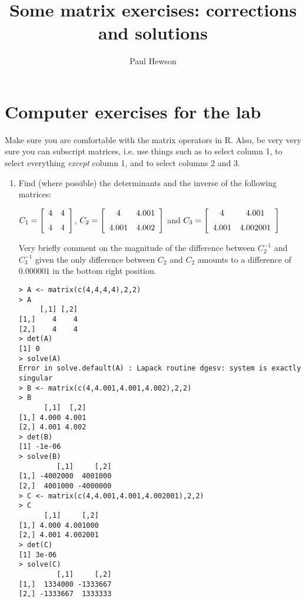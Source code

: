 \documentclass{article}
\title{Some matrix exercises: corrections and solutions}
\author{Paul Hewson}
\begin{document}
\maketitle

\section{Computer exercises for the lab}

Make sure you are comfortable with the matrix operators in R.   Also, be very very sure you can subscript matrices, i.e. use things such as \text{[,1]} to select column 1, \text{[,-1]} to select everything \emph{except} column 1, and \text{[,2:3]} to select columns 2 and 3.

\begin{enumerate}

\item Find (where possible) the determinants and the inverse of the following matrices:

$C_{1} = \left[ \begin {array}{cc} 4& 4\\\noalign{\medskip} 4& 4\end {array} \right]$, $C_{2} = \left[ \begin {array}{cc} 4& 4.001\\\noalign{\medskip} 4.001& 4.002\end {array} \right]$ and $C_{3} = \left[ \begin {array}{cc} 4& 4.001\\\noalign{\medskip} 4.001& 4.002001\end {array} \right] $

Very briefly comment on the magnitude of the difference between $C_{2}^{-1}$ and  $C_{3}^{-1}$ given the only difference between $C_{2}$ and $C_{2}$ amounts to a difference of $0.000001$ in the bottom right position.

\begin{verbatim}
> A <- matrix(c(4,4,4,4),2,2)
> A
     [,1] [,2]
[1,]    4    4
[2,]    4    4
> det(A)
[1] 0
> solve(A)
Error in solve.default(A) : Lapack routine dgesv: system is exactly singular
> B <- matrix(c(4,4.001,4.001,4.002),2,2)
> B
      [,1]  [,2]
[1,] 4.000 4.001
[2,] 4.001 4.002
> det(B)
[1] -1e-06
> solve(B)
         [,1]     [,2]
[1,] -4002000  4001000
[2,]  4001000 -4000000
> C <- matrix(c(4,4.001,4.001,4.002001),2,2)
> C
      [,1]     [,2]
[1,] 4.000 4.001000
[2,] 4.001 4.002001
> det(C)
[1] 3e-06
> solve(C)
         [,1]     [,2]
[1,]  1334000 -1333667
[2,] -1333667  1333333
\end{verbatim}


\end{enumerate}
\end{document}
